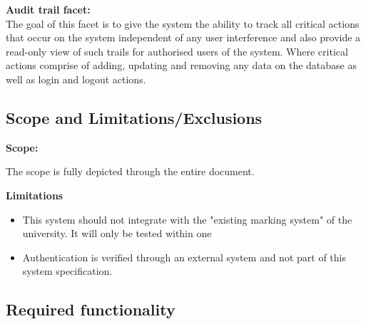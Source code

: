 \documentclass[12pt]{article}
\begin{document}
\begin{flushleft}
				\vspace{0.5cm}
				\textbf{Audit trail facet:}
				\vspace{0.1in}
				\\
				The goal of this facet is to give the system the ability to track all critical actions that occur on the system independent of any user interference and also provide a read-only view of such trails for authorised users of the system. Where critical actions comprise of adding, updating and removing any data on the database as well as login and logout actions.
			\end{flushleft}
			
			
			\vspace{0.2in}
			
		\subsection{Scope and Limitations/Exclusions}
		
			\vspace{0.2in}
			
			\begin{flushleft}
				\textbf{Scope:}
			\end{flushleft}
			
			The scope is fully depicted through the entire document.
			
			\begin{flushleft}
				\textbf{Limitations}
			\end{flushleft}
						
			\vspace{0.02in}
			
			\begin{itemize}
				\item This system should not integrate with the "existing marking system" of the university. It will only be tested within one 
				\item Authentication is verified through an external system and not part of this system specification.
			\end{itemize}
			
			
		\vspace{0.2in}
		
		\subsection{Required functionality}
		
			\vspace{0.2in}
			
\end{document}

